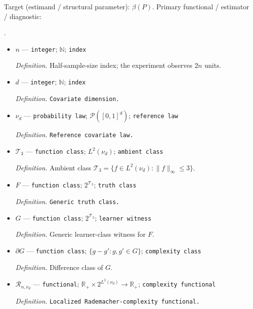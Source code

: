 \documentclass{article}
\begin{document}
Target (estimand / structural parameter): \(\beta(P)\).
Primary functional / estimator / diagnostic: \par\noindent {}\par\noindent.
\begin{itemize}
  \item \(n\) --- \texttt{integer}; \(\mathbb N\); \texttt{index}
  \par\smallskip\noindent\emph{Definition.} Half-sample-size index; the experiment observes \(2n\) units.
  \item \(d\) --- \texttt{integer}; \(\mathbb N\); \texttt{index}
  \par\smallskip\noindent\emph{Definition.} \texttt{Covariate dimension.}
  \item \(\nu_d\) --- \texttt{probability law}; \(\mathcal P([0,1]^d)\); \texttt{reference law}
  \par\smallskip\noindent\emph{Definition.} \texttt{Reference covariate law.}
  \item \(\mathcal T_3\) --- \texttt{function class}; \(L^2(\nu_d)\); \texttt{ambient class}
  \par\smallskip\noindent\emph{Definition.} Ambient class \(\mathcal T_3=\{f\in L^2(\nu_d):\lVert f\rVert_\infty\le3\}\).
  \item \(F\) --- \texttt{function class}; \(2^{\mathcal T_3}\); \texttt{truth class}
  \par\smallskip\noindent\emph{Definition.} \texttt{Generic truth class.}
  \item \(G\) --- \texttt{function class}; \(2^{\mathcal T_3}\); \texttt{learner witness}
  \par\smallskip\noindent\emph{Definition.} Generic learner-class witness for \(F\).
  \item \(\partial G\) --- \texttt{function class}; \(\{g-g':g,g'\in G\}\); \texttt{complexity class}
  \par\smallskip\noindent\emph{Definition.} Difference class of \(G\).
  \item \(\mathcal R_{n,\nu_d}\) --- \texttt{functional}; \(\mathbb R_+\times2^{L^2(\nu_d)}\to\mathbb R_+\); \texttt{complexity functional}
  \par\smallskip\noindent\emph{Definition.} \texttt{Localized Rademacher-\allowbreak{}complexity functional.}

\end{itemize}
\end{document}
